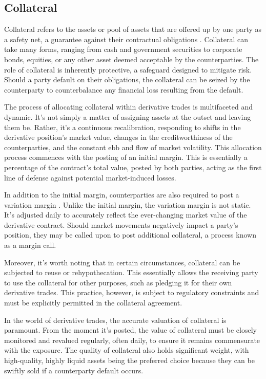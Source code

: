 \subsection{Collateral}
\label{subsec:collateral}
Collateral refers to the assets or pool of assets that are offered up by one party as a safety net, a guarantee against their contractual obligations \citep{isda_blueprint_collateral_processing}. Collateral can take many forms, ranging from cash and government securities to corporate bonds, equities, or any other asset deemed acceptable by the counterparties. The role of collateral is inherently protective, a safeguard designed to mitigate risk. Should a party default on their obligations, the collateral can be seized by the counterparty to counterbalance any financial loss resulting from the default.

The process of allocating collateral within derivative trades is multifaceted and dynamic. It's not simply a matter of assigning assets at the outset and leaving them be. Rather, it's a continuous recalibration, responding to shifts in the derivative position's market value, changes in the creditworthiness of the counterparties, and the constant ebb and flow of market volatility. This allocation process commences with the posting of an initial margin. This is essentially a percentage of the contract's total value, posted by both parties, acting as the first line of defense against potential market-induced losses.

In addition to the initial margin, counterparties are also required to post a variation margin \citep{IM}. Unlike the initial margin, the variation margin is not static. It's adjusted daily to accurately reflect the ever-changing market value of the derivative contract. Should market movements negatively impact a party's position, they may be called upon to post additional collateral, a process known as a margin call.

Moreover, it's worth noting that in certain circumstances, collateral can be subjected to reuse or rehypothecation. This essentially allows the receiving party to use the collateral for other purposes, such as pledging it for their own derivative trades. This practice, however, is subject to regulatory constraints and must be explicitly permitted in the collateral agreement.

In the world of derivative trades, the accurate valuation of collateral is paramount. From the moment it's posted, the value of collateral must be closely monitored and revalued regularly, often daily, to ensure it remains commensurate with the exposure. The quality of collateral also holds significant weight, with high-quality, highly liquid assets being the preferred choice because they can be swiftly sold if a counterparty default occurs.